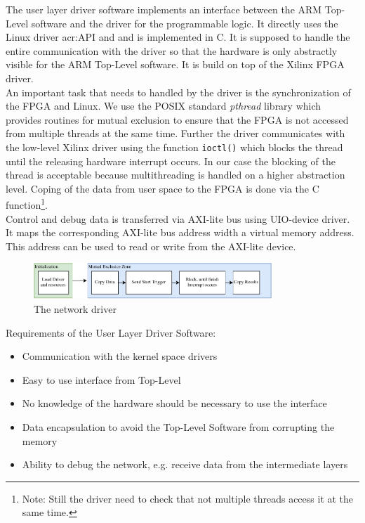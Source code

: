 The user layer driver software implements an interface between the ARM Top-Level software and the driver for the programmable logic. It directly uses the Linux driver \gls{acr:API} and and is implemented in C. It is supposed to handle the entire communication with the driver so that the hardware is only abstractly visible for the ARM Top-Level software. It is build on top of the Xilinx FPGA driver. \\
\noindent
An important task that needs to handled by the driver is the synchronization of the FPGA and Linux. We use the POSIX standard \emph{pthread} library which provides routines for mutual exclusion to ensure that the FPGA is not accessed from multiple threads at the same time. Further the driver communicates with the low-level Xilinx driver using the function \texttt{ioctl()} which blocks the thread until the releasing hardware interrupt occurs. In our case the blocking of the thread is acceptable because multithreading is handled on a higher abstraction level. Coping of the data from user space to the FPGA is done via the C function\footnote{Note: Still the driver need to check that not multiple threads access it at the same time.}. \\
Control and debug data is transferred via AXI-lite bus using UIO-device driver. It maps the corresponding AXI-lite bus address width a virtual memory address. This address can be used to read or write from the AXI-lite device. 



\begin{figure}[hbt]
  \centering
  \includegraphics[width=0.8\textwidth]{img/eggdriver.pdf}
  \caption{The network driver}
  \label{fig:sw-python-eggdriver-build}
\end{figure}

Requirements of the User Layer Driver Software:
\begin{itemize} 
	\item Communication with the kernel space drivers 
	\item Easy to use interface from Top-Level 
	\item No knowledge of the hardware should be necessary to use the interface
	\item Data encapsulation to avoid the Top-Level Software from corrupting the memory 
	\item Ability to debug the network, e.g. receive data from the intermediate layers
\end{itemize}

